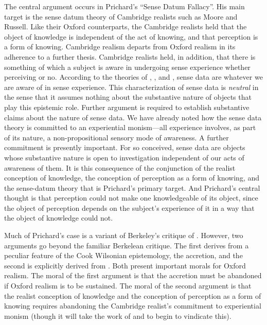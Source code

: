 
The central argument occurs in Prichard's \citeyearpar{Prichard:1938ve} ``Sense Datum Fallacy''. His main target is the sense datum theory of Cambridge realists such as Moore and Russell. Like their Oxford counterparts, the Cambridge realists held that the object of knowledge is independent of the act of knowing, and that perception is a form of knowing. Cambridge realism departs from Oxford realism in its adherence to a further thesis. Cambridge realists held, in addition, that there is something of which a subject is aware in undergoing sense experience whether perceiving or no. According to the theories of \citet{Moore:1953nx}, \citet{Russell:1912uq}, and \citet{Price:1932fk}, sense data are whatever we are aware of in sense experience. This characterization of sense data is \emph{neutral} in the sense that it assumes nothing about the substantive nature of objects that play this epistemic role. Further argument is required to establish substantive claims about the nature of sense data. We have already noted how the sense data theory is committed to an experiential monism---all experience involves, as part of its nature, a non-propositional sensory mode of awareness. A further commitment is presently important. For so conceived, sense data are objects whose substantive nature is open to investigation independent of our acts of awareness of them. It is this consequence of the conjunction of the realist conception of knowledge, the conception of perception as a form of knowing, and the sense-datum theory that is Prichard's primary target. And Prichard's central thought is that perception could not make one knowledgeable of its object, since the object of perception depends on the subject's experience of it in a way that the object of knowledge could not.

Much of Prichard's case is a variant of Berkeley's \citeyearpar{Berkeley:1734fk,Berkeley:1734zp} critique of \citet{Locke1690An-Essay-Concer}. However, two arguments go beyond the familiar Berkelean critique. The first derives from a peculiar feature of the Cook Wilsonian epistemology, the accretion, and the second is explicitly derived from \citet{Paul:1936kd}. Both present important morals for Oxford realism. The moral of the first argument is that the accretion must be abandoned if Oxford realism is to be sustained. The moral of the second argument is that the realist conception of knowledge and the conception of perception as a form of knowing requires abandoning the Cambridge realist's commitment to experiential monism (though it will take the work of \citet{Austin:1962lr} and \citet{Hinton:1973js} to begin to vindicate this).

